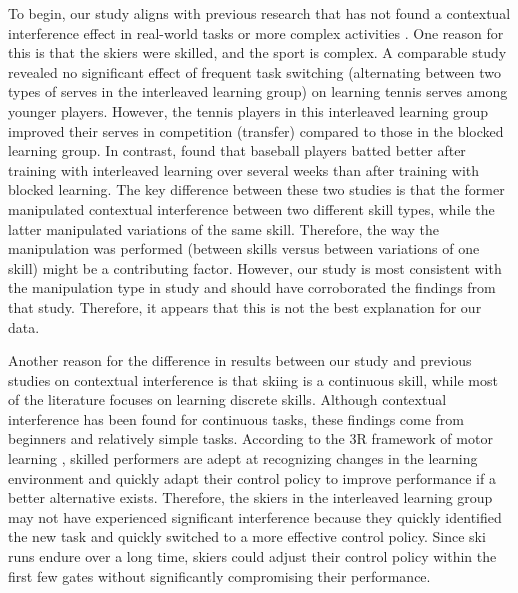 To begin, our study aligns with previous research that has not found a contextual interference effect in real-world tasks or more complex activities \cite{brady_theoretical_1998, barreiros_contextual_2007, wulf_principles_2002}. One reason for this is that the skiers were skilled, and the sport is complex. A comparable study revealed no significant effect of frequent task switching (alternating between two types of serves in the interleaved learning group) on learning tennis serves among younger players\cite{buszard_quantifying_2017}. However, the tennis players in this interleaved learning group improved their serves in competition (transfer) compared to those in the blocked learning group. In contrast, \cite{hall_contextual_1994} found that baseball players batted better after training with interleaved learning over several weeks than after training with blocked learning. The key difference between these two studies is that the former manipulated contextual interference between two different skill types, while the latter manipulated variations of the same skill. Therefore, the way the manipulation was performed (between skills versus between variations of one skill) might be a contributing factor. However, our study is most consistent with the manipulation type in \cite{hall_contextual_1994} study and should have corroborated the findings from that study. Therefore, it appears that this is not the best explanation for our data.

Another reason for the difference in results between our study and previous studies on contextual interference is that skiing is a continuous skill, while most of the literature focuses on learning discrete skills\cite{lee_distribution_1988, lee_distribution_1989}. Although contextual interference has been found for continuous tasks\cite{pauwels_contextual_2014, tsutsui_contextual_1998}, these findings come from beginners and relatively simple tasks. According to the 3R framework of motor learning \cite{tsay_strategy_2023}, skilled performers are adept at recognizing changes in the learning environment and quickly adapt their control policy to improve performance if a better alternative exists. Therefore, the skiers in the interleaved learning group may not have experienced significant interference because they quickly identified the new task and quickly switched to a more effective control policy. Since ski runs endure over a long time, skiers could adjust their control policy within the first few gates without significantly compromising their performance.

